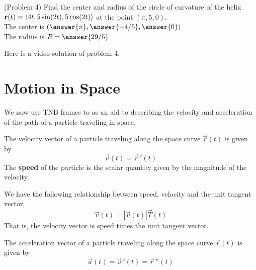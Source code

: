 \documentclass[handout]{ximera}
\begin{document}
\begin{problem}(Problem 4)
Find the center and radius of the circle of curvature of the helix $\mathbf r(t) = \left\langle 4t, 5 \sin(2t),5\cos(2t)\right\rangle$ at the point $(\pi, 5, 0)$.\\

The center is $\left(\answer{\pi}, \answer{-4/5}, \answer{0}\right)$\\
The radius is $R = \answer{29/5}$
\end{problem}

Here is a video solution of problem 4:\\

\begin{foldable}
\end{foldable}


\section{Motion in Space}

We now use TNB frames to as an aid to describing the velocity and acceleration of the path of a particle traveling in space.

\begin{definition}[Velocity]
The velocity vector of a particle traveling along the space curve $\vec r(t)$ is given by
\[
\vec v(t) = \vec r\,'(t)
\]
The \textbf{speed} of the particle is the scalar quantity given by the magnitude of the velocity.
\end{definition}

\begin{remark}
We have the following relationship between speed, velocity and the unit tangent vector,
\[
\vec v(t) = |\vec v(t)| \vec T(t)
\]
That is, the velocity vector is speed times the unit tangent vector.
\end{remark}

\begin{definition}[Acceleration]
The acceleration vector of a particle traveling along the space curve $\vec r(t)$ is given by
\[
\vec a(t) = \vec v\,'(t) = \vec r\,''(t)
\]
\end{definition}
\end{document}
